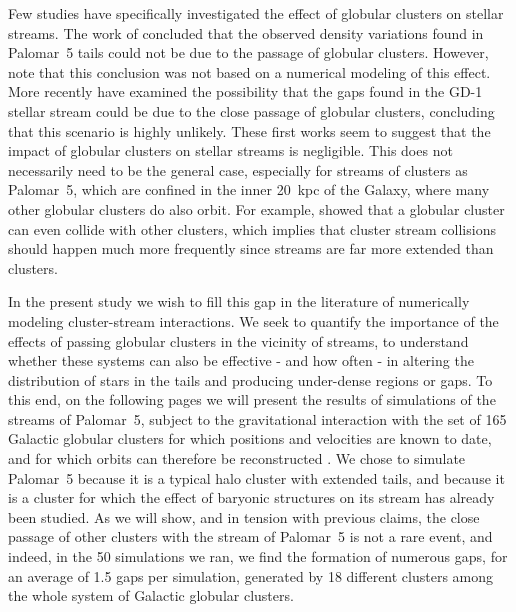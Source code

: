 \documentclass[draft]{aa}
\begin{document}
  Few studies have specifically investigated the effect of globular clusters on stellar streams. The work of \citet{2017MNRAS.470...60E} concluded that the observed density variations found in Palomar~5 tails could not be due to the passage of globular clusters. However, note that this conclusion was not based on a numerical modeling of this effect. More recently \citet{2022ApJ...941..129D} have examined the possibility that the gaps found in the GD-1 stellar stream could be due to the close passage of globular clusters, concluding that this scenario is highly unlikely. These first works seem to suggest that the impact of globular clusters on stellar streams is negligible. This does not necessarily need to be the general case, especially for streams of clusters as Palomar~5, which are confined in the inner 20~kpc of the Galaxy, where many other globular clusters do also orbit. For example, \citet{2023A&A...678A..69I} showed that a globular cluster can even collide with other clusters, which implies that cluster stream collisions should happen much more frequently since streams are far more extended than clusters. 
  
  In the present study we wish to fill this gap in the literature of numerically modeling cluster-stream interactions. We seek to quantify the importance of the effects of passing globular clusters in the vicinity of streams, to understand whether these systems can also be effective - and how often - in altering the distribution of stars in the tails and producing under-dense regions or gaps. To this end, on the following pages we will present the results of simulations of the streams of Palomar~5, subject to the gravitational interaction with the set of 165 Galactic globular clusters for which positions and velocities are known to date, and for which orbits can therefore be reconstructed \citep{2021MNRAS.505.5957B}. We chose to simulate Palomar~5 because it is a typical halo cluster with extended tails, and because it is a cluster for which the effect of baryonic structures on its stream has already been studied. As we will show, and in tension with previous claims, the close passage of other clusters with the stream of Palomar~5 is not a rare event, and indeed, in the 50 simulations we ran, we find the formation of numerous gaps, for an average of 1.5 gaps per simulation, generated by 18 different clusters among the whole system of Galactic globular clusters.
\end{document}
